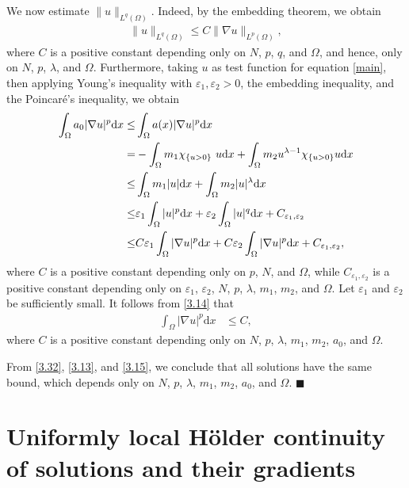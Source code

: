 \documentclass[onecolumn]{autart}
\newenvironment{proof}{{\it Proof: \enspace}}{\hfill $\blacksquare$\par}
\begin{document}
\begin{proof}
		We now estimate   $\| u \|_{L^{q}(\Omega)}$. Indeed, by the embedding theorem, we obtain
		\begin{align}\label{3.13}
			\| u \|_{L^{q}(\Omega)}\leq C \| \nabla u \|_{L^{p}(\Omega)},
		\end{align}
		where $C$ is a positive  constant  depending only on $N$, $p$, $q$, and $\Omega$, and hence, only on $N$, $p$, $\lambda$, and $\Omega$.
		Furthermore, taking  $u$ as test function for equation \eqref{main}, then applying Young's inequality with $\varepsilon_1,\varepsilon_2 >0$, the embedding inequality, and the Poincar\'e's inequality, we obtain
		\begin{align}
			\int_{\Omega} a_0  | \nabla u |^p \mathrm{d}x
			\leq
			& \int_{\Omega} a(x)  | \nabla u |^p \mathrm{d}x
			\notag\\ =
			&-\int_{\Omega} m_1 \chi_{\{u>0\}}\ u \mathrm{d}x+ \int_{\Omega} m_2 u^{\lambda - 1} \chi_{\{u > 0\}} u \mathrm{d}x
			\notag\\ \leq
			& \int_{\Omega} m_1 | u| \mathrm{d}x+ \int_{\Omega} m_2 |u|^{\lambda}  \mathrm{d}x
			\notag\\ \leq
			&  \varepsilon_1\int_{\Omega} | u|^p \mathrm{d}x+ \varepsilon_2 \int_{\Omega} |u|^{q}  \mathrm{d}x +C_{\varepsilon_1, \varepsilon_2}
			\notag\\ \leq
			&  C \varepsilon_1\int_{\Omega} | \nabla u|^p \mathrm{d}x+ C\varepsilon_2 \int_{\Omega} |\nabla u|^{p}  \mathrm{d}x +C_{\varepsilon_1, \varepsilon_2},\label{3.14}
		\end{align}
		where   $C$ is  a positive constant depending only on $p$, $N$, and $\Omega$, while $C_{\varepsilon_1, \varepsilon_2}$ is  a positive constant depending  only on $\varepsilon_1$, $\varepsilon_2$, $N$, $p$, $\lambda$, $m_1$, $m_2$,    and $\Omega$.
		Let  $\varepsilon_1$ and $\varepsilon_2$ be  sufficiently small. It follows from \eqref{3.14} that
		\begin{align}\label{3.15}
			\int_{\Omega}  | \nabla u |^p \mathrm{d}x &\leq C,
		\end{align}
		where $C$ is a positive  constant  depending only on $N$, $p$, $\lambda$, $m_1$, $m_2$, $a_0$, and $\Omega$.
		
		From \eqref{3.32}, \eqref{3.13}, and \eqref{3.15}, we conclude  that all solutions have the same  bound, which {depends  only on} $N$, $p$, $\lambda$, $m_1$, $m_2$,  $a_0$,  and $\Omega$.
	\end{proof}
	
	
	
	
	\section{Uniformly local H\"older continuity of solutions and their gradients}\label{Sec.4}
	
\end{document}

